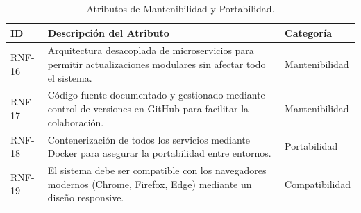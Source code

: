 \begin{table}[h!]
\centering
\scriptsize
\caption{Atributos de Mantenibilidad y Portabilidad.}
\label{tab:rnf_mantenimiento}
\begin{tabular}{@{} l p{9.5cm} l @{}}
\toprule
\rowcolor[HTML]{2D3E50} 
\textbf{\color[HTML]{FFFFFF} ID} & \textbf{\color[HTML]{FFFFFF} Descripción del Atributo} & \textbf{\color[HTML]{FFFFFF} Categoría} \\ \midrule
RNF-16 & Arquitectura desacoplada de microservicios para permitir actualizaciones modulares sin afectar todo el sistema. & Mantenibilidad \\
\rowcolor[HTML]{F2F4F7} 
RNF-17 & Código fuente documentado y gestionado mediante control de versiones en GitHub para facilitar la colaboración. & Mantenibilidad \\
RNF-18 & Contenerización de todos los servicios mediante Docker para asegurar la portabilidad entre entornos. & Portabilidad \\
\rowcolor[HTML]{F2F4F7} 
RNF-19 & El sistema debe ser compatible con los navegadores modernos (Chrome, Firefox, Edge) mediante un diseño responsive. & Compatibilidad \\ \bottomrule
\end{tabular}
\end{table}